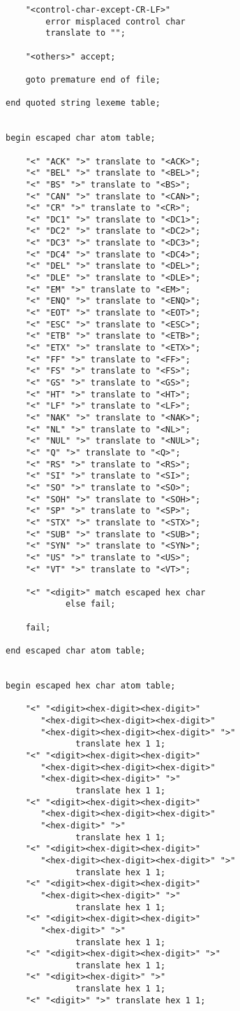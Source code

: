 \documentclass[12pt]{article}
\newenvironment{indpar}[1][0.3in]%
	{\begin{list}{}%
		     {\setlength{\itemsep}{0in}%
		      \setlength{\topsep}{0in}%
		      \setlength{\parsep}{1ex}%
		      \setlength{\labelwidth}{#1}%
		      \setlength{\leftmargin}{#1}%
		      \addtolength{\leftmargin}{\labelsep}}%
	 \item}%
	{\end{list}}
\begin{document}
\begin{indpar}
\begin{verbatim}
    "<control-char-except-CR-LF>"
        error misplaced control char
        translate to "";

    "<others>" accept;

    goto premature end of file;

end quoted string lexeme table;


begin escaped char atom table;

    "<" "ACK" ">" translate to "<ACK>";
    "<" "BEL" ">" translate to "<BEL>";
    "<" "BS" ">" translate to "<BS>";
    "<" "CAN" ">" translate to "<CAN>";
    "<" "CR" ">" translate to "<CR>";
    "<" "DC1" ">" translate to "<DC1>";
    "<" "DC2" ">" translate to "<DC2>";
    "<" "DC3" ">" translate to "<DC3>";
    "<" "DC4" ">" translate to "<DC4>";
    "<" "DEL" ">" translate to "<DEL>";
    "<" "DLE" ">" translate to "<DLE>";
    "<" "EM" ">" translate to "<EM>";
    "<" "ENQ" ">" translate to "<ENQ>";
    "<" "EOT" ">" translate to "<EOT>";
    "<" "ESC" ">" translate to "<ESC>";
    "<" "ETB" ">" translate to "<ETB>";
    "<" "ETX" ">" translate to "<ETX>";
    "<" "FF" ">" translate to "<FF>";
    "<" "FS" ">" translate to "<FS>";
    "<" "GS" ">" translate to "<GS>";
    "<" "HT" ">" translate to "<HT>";
    "<" "LF" ">" translate to "<LF>";
    "<" "NAK" ">" translate to "<NAK>";
    "<" "NL" ">" translate to "<NL>";
    "<" "NUL" ">" translate to "<NUL>";
    "<" "Q" ">" translate to "<Q>";
    "<" "RS" ">" translate to "<RS>";
    "<" "SI" ">" translate to "<SI>";
    "<" "SO" ">" translate to "<SO>";
    "<" "SOH" ">" translate to "<SOH>";
    "<" "SP" ">" translate to "<SP>";
    "<" "STX" ">" translate to "<STX>";
    "<" "SUB" ">" translate to "<SUB>";
    "<" "SYN" ">" translate to "<SYN>";
    "<" "US" ">" translate to "<US>";
    "<" "VT" ">" translate to "<VT>";

    "<" "<digit>" match escaped hex char
            else fail;

    fail;

end escaped char atom table;


begin escaped hex char atom table;

    "<" "<digit><hex-digit><hex-digit>"
       "<hex-digit><hex-digit><hex-digit>"
       "<hex-digit><hex-digit><hex-digit>" ">"
              translate hex 1 1;
    "<" "<digit><hex-digit><hex-digit>"
       "<hex-digit><hex-digit><hex-digit>"
       "<hex-digit><hex-digit>" ">"
              translate hex 1 1;
    "<" "<digit><hex-digit><hex-digit>"
       "<hex-digit><hex-digit><hex-digit>"
       "<hex-digit>" ">"
              translate hex 1 1;
    "<" "<digit><hex-digit><hex-digit>"
       "<hex-digit><hex-digit><hex-digit>" ">"
              translate hex 1 1;
    "<" "<digit><hex-digit><hex-digit>"
       "<hex-digit><hex-digit>" ">"
              translate hex 1 1;
    "<" "<digit><hex-digit><hex-digit>"
       "<hex-digit>" ">"
              translate hex 1 1;
    "<" "<digit><hex-digit><hex-digit>" ">"
              translate hex 1 1;
    "<" "<digit><hex-digit>" ">"
              translate hex 1 1;
    "<" "<digit>" ">" translate hex 1 1;


\end{verbatim}
\end{indpar}
\end{document}
